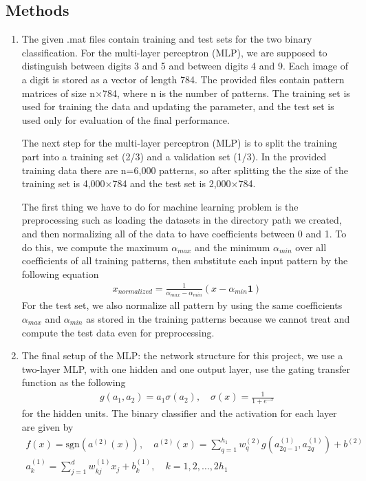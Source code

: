 \subsection{Methods}
\begin{enumerate}[(1)]
\item The given .mat files contain training and test sets for the two binary classification. For the multi-layer perceptron (MLP), we are supposed to distinguish between digits 3 and 5 and between digits 4 and 9. Each image of a digit is stored as a vector of length 784. The provided files contain pattern matrices of size n$\times$784, where n is the number of patterns. The training set is used for training the data and updating the parameter, and the test set is used only for evaluation of the final performance.

	The next step for the multi-layer perceptron (MLP) is to split the training part into a training set (2/3) and a validation set (1/3). In the provided training data there are n=6,000 patterns, so after splitting the the size of the training set is 4,000$\times$784 and the test set is 2,000$\times$784.

	The first thing we have to do for machine learning problem is the preprocessing such as loading the datasets in the directory path we created, and then normalizing all of the data to have coefficients between 0 and 1. To do this, we compute the maximum $\alpha_{max}$ and the minimum $\alpha_{min}$ over all coefficients of all training patterns, then substitute each input pattern by the following equation
\begin{align}
x_{normalized}=\frac{1}{\alpha_{max} - \alpha_{min}}(x-\alpha_{min}\mathbf{1})
\end{align}
For the test set, we also normalize all pattern by using the same coefficients $\alpha_{max}$ and $\alpha_{min}$ as stored in the training patterns because we cannot treat and compute the test data even for preprocessing.

\item The final setup of the MLP: the network structure for this project, we use a two-layer MLP, with one hidden and one output layer, use the gating transfer function as the following
\begin{align}
g(a_1,a_2)=a_1 \sigma(a_2),\quad\sigma(x) = \frac{1}{1+e^{-x}}
\end{align}
for the hidden units. The binary classifier and the activation for each layer are given by
\begin{align}
f(x)=\text{sgn}(a^{(2)}(x)),\quad a^{(2)}(x) = \sum_{q=1}^{h_1} w_{q}^{(2)} g(a_{2q-1}^{(1)}, a_{2q}^{(1)})+b^{(2)}\\
a_{k}^{(1)} = \sum_{j=1}^{d} w_{kj}^{(1)}x_{j}+b_{k}^{(1)},\quad k=1,2,\dots,2h_{1}
\end{align}


\end{enumerate}
